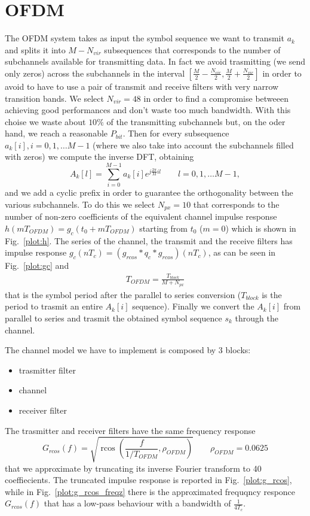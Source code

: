 \documentclass[a4paper,oneside]{article}
\DeclareMathOperator*{\rcos}{rcos}
\begin{document}
\section{OFDM}
\label{sec:ofdm}
The OFDM system takes as input the symbol sequence we want to transmit $a_k$ and splits it into $M-N_{vir}$ subsequences that corresponds to the number of subchannels available for transmitting data. In fact we avoid trasmitting (we send only zeros) across the subchannels in the interval $[\frac{M}{2}-\frac{N_{vir}}{2},\frac{M}{2}+\frac{N_{vir}}{2}]$ in order to avoid to have to use a pair of transmit and receive filters with very narrow transition bands.
We select $N_{vir} = 48$ in order to find a compromise betweeen achieving good performances and don't waste too much bandwidth. With this choise we waste about $ 10\% $ of the transmitting subchannels but, on the oder hand, we reach a reasonable $ P_{bit} $.
Then for every subsequence $a_k[i], i = 0,1,\dots M-1$ (where we also take into account the subchannels filled with zeros) we compute the inverse DFT, obtaining
\begin{equation}
  A_k[l] = \sum_{i=0}^{M-1}a_k[i]e^{j\frac{2\pi}{M}il} \qquad l=0,1,\dots M-1 ,
\end{equation}
and we add a cyclic prefix in order to guarantee the orthogonality between the various subchannels. To do this we select $N_{px} = 10$ that corresponds to the number of  non-zero coefficients of the equivalent channel impulse response $h(mT_{OFDM}) = g_c(t_0+ mT_{OFDM})$ starting from $t_0$ ($m = 0$) which is shown in Fig.~\ref{plot:h}. The series of the channel, the transmit and the receive filters has impulse response $g_c(nT_c) = \left(g_{rcos}*q_c*g_{rcos}\right)(nT_c)$, as can be seen in Fig.~\ref{plot:gc} and 
\begin{align*}
T_{OFDM} = \frac{T_{block}}{M+N_{px}}
\end{align*} 
that is the symbol period after the parallel to series conversion ($T_{block}$ is the period to trasmit an entire $A_k[i]$ sequence).
Finally we convert the $A_k[i]$ from parallel to series and trasmit the obtained symbol sequence $s_k$ through the channel.

The channel model we have to implement is composed by 3 blocks:
\begin{itemize}
\item trasmitter filter
\item channel
\item receiver filter
\end{itemize} 
The trasmitter and receiver filters have the same frequency response
\begin{equation}
  G_{rcos}(f) = \sqrt{\rcos\left(\frac{f}{1/T_{OFDM}}, \rho_{OFDM}\right)} \qquad \rho_{OFDM} = 0.0625
\end{equation}
that we approximate by truncating its inverse Fourier transform to 40
coeffiecients.
The truncated impulse response is reported in Fig.~\ref{plot:g_rcos}, while in Fig.~\ref{plot:g_rcos_freqz} there is the approximated frequqncy responce $G_{rcos}(f)$ that has a low-pass behaviour with a bandwidth of $\frac{1}{4T_c}$.
\end{document}
